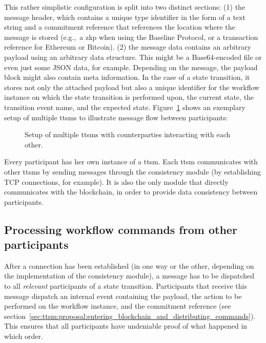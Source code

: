 This rather simplistic configuration is split into two distinct sections: (1) the message header, which contains a unique type identifier in the form of a text string and a commitment reference that references the location where the message is stored (e.g.,\ a \gls{zkp} when using the Baseline Protocol, or a transaction reference for Ethereum or Bitcoin). (2) the message data contains an arbitrary payload using an arbitrary data structure. This might be a Base64-encoded file or even just some JSON data, for example. Depending on the message, the payload block might also contain meta information. In the case of a state transition, it stores not only the attached payload but also a unique identifier for the workflow instance on which the state transition is performed upon, the current state, the transition event name, and the expected state. Figure~\ref{fig:concept:multiple_participants} shows an exemplary setup of multiple \glspl{ttsm} to illustrate message flow between participants:

\begin{figure}[h]
    \caption{Setup of multiple \glspl{ttsm} with counterparties interacting with each other.}
    \label{fig:concept:multiple_participants}
\end{figure}

Every participant has her own instance of a \gls{ttsm}. Each \gls{ttsm} communicates with other \glspl{ttsm} by sending messages through the consistency module (by establishing TCP connections, for example). It is also the only module that directly communicates with the blockchain, in order to provide data consistency between participants.


\subsection{Processing workflow commands from other participants}
\label{sec:ttsm:proposal:receiving_commands}
After a connection has been established (in one way or the other, depending on the implementation of the consistency module), a message has to be dispatched to all \textit{relevant} participants of a state transition. Participants that receive this message dispatch an internal event containing the payload, the action to be performed on the workflow instance, and the commitment reference (see section~\ref{sec:ttsm:proposal:entering_blockchain_and_distributing_commands}). This ensures that all participants have undeniable proof of what happened in which order.

